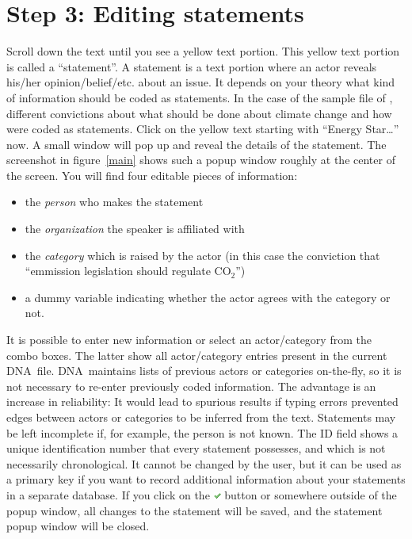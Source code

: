 \documentclass[12pt,a4paper]{scrreprt}
\newcommand{\dnashort}{\textsc{DNA}}
\begin{document}
\section*{Step 3: Editing statements}
Scroll down the text until you see a yellow text portion. This yellow text portion is called a ``statement''. A statement is a text portion where an actor reveals his/her opinion/belief/etc. about an issue. It depends on your theory what kind of information should be coded as statements. In the case of the sample file of \citet{fisher2009understanding}, different convictions about what should be done about climate change and how were coded as statements. Click on the yellow text starting with ``Energy Star\ldots'' now. A small window will pop up and reveal the details of the statement. The screenshot in figure~\ref{main} shows such a popup window roughly at the center of the screen. You will find four editable pieces of information:
\begin{itemize}
 \item the \emph{person} who makes the statement
 \item the \emph{organization} the speaker is affiliated with
 \item the \emph{category} which is raised by the actor (in this case the conviction that ``emmission legislation should regulate CO$_2$'')
 \item a dummy variable indicating whether the actor agrees with the category or not.
\end{itemize}
 It is possible to enter new information or select an actor/category from the combo boxes. The latter show all actor/category entries present in the current \dnashort\ file. \dnashort\ maintains lists of previous actors or categories on-the-fly, so it is not necessary to re-enter previously coded information. The advantage is an increase in reliability: It would lead to spurious results if typing errors prevented edges between actors or categories to be inferred from the text. Statements may be left incomplete if, for example, the person is not known. The ID field shows a unique identification number that every statement possesses, and which is not necessarily chronological. It cannot be changed by the user, but it can be used as a primary key if you want to record additional information about your statements in a separate database. If you click on the \includegraphics[height=9px]{icons-tick.png} button or somewhere outside of the popup window, all changes to the statement will be saved, and the statement popup window will be closed.
\end{document}
